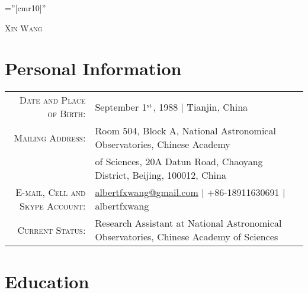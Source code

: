 \documentclass[10pt]{article}
\begin{document}
\pagestyle{empty}    %
\font\fb=''[cmr10]'' %

\par{\centering
  {\huge \textsc{Xin Wang}}
\par}
\vspace{-1em}

\section{Personal Information}

\begin{tabular}{rl}
    \textsc{Date and Place of Birth:}       & September 1$^{\rm st}$, 1988  |  Tianjin, China \\
    \textsc{Mailing Address:} & Room 504, Block A, National Astronomical Observatories, Chinese Academy\\
                              & of Sciences, 20A Datun Road, Chaoyang District, Beijing, 100012, China \\
    \textsc{E-mail, Cell and Skype Account:}  & \href{mailto:albertfxwang@gmail.com}{albertfxwang@gmail.com}  |  +86-18911630691  |  albertfxwang \\
    \textsc{Current Status:}
& Research Assistant at National Astronomical Observatories, Chinese Academy of Sciences  \\
\end{tabular}


\section{Education}
\end{document}

